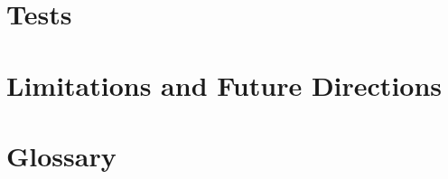 






 


\chapter{Tests}
\label{sec:tests}













\restoregeometry
\chapter{Limitations and Future Directions}
\label{sec:future}



\chapter*{Glossary}







